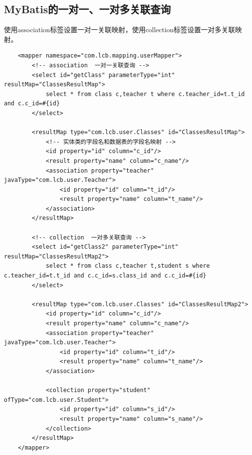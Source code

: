 \subsection{MyBatis的一对一、一对多关联查询}
使用association标签设置一对一关联映射，使用collection标签设置一对多关联映射。
\begin{verbatim}
    <mapper namespace="com.lcb.mapping.userMapper">
        <!-- association  一对一关联查询 -->
        <select id="getClass" parameterType="int" resultMap="ClassesResultMap">
            select * from class c,teacher t where c.teacher_id=t.t_id and c.c_id=#{id}
        </select>

        <resultMap type="com.lcb.user.Classes" id="ClassesResultMap">
            <!-- 实体类的字段名和数据表的字段名映射 -->
            <id property="id" column="c_id"/>
            <result property="name" column="c_name"/>
            <association property="teacher" javaType="com.lcb.user.Teacher">
                <id property="id" column="t_id"/>
                <result property="name" column="t_name"/>
            </association>
        </resultMap>

        <!-- collection  一对多关联查询 -->
        <select id="getClass2" parameterType="int" resultMap="ClassesResultMap2">
            select * from class c,teacher t,student s where c.teacher_id=t.t_id and c.c_id=s.class_id and c.c_id=#{id}
        </select>

        <resultMap type="com.lcb.user.Classes" id="ClassesResultMap2">
            <id property="id" column="c_id"/>
            <result property="name" column="c_name"/>
            <association property="teacher" javaType="com.lcb.user.Teacher">
                <id property="id" column="t_id"/>
                <result property="name" column="t_name"/>
            </association>

            <collection property="student" ofType="com.lcb.user.Student">
                <id property="id" column="s_id"/>
                <result property="name" column="s_name"/>
            </collection>
        </resultMap>
    </mapper>
\end{verbatim}
